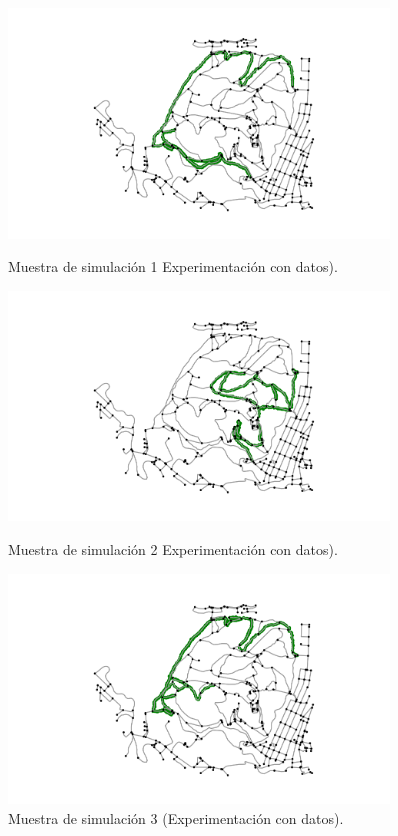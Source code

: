 \begin{figure}[!htb]
\centering
\begin{minipage}{0.70\textwidth}
\includegraphics[width=0.9\textwidth]{./Imagenes/SimulatedTrack1.png}
\caption{Muestra de simulación 1 Experimentación con datos).}
\label{figure:SimulatedTrack1}
\end{minipage}
\begin{minipage}{0.48\textwidth}
\includegraphics[width=0.9\textwidth]{./Imagenes/SimulatedTrack2.png}
\caption{Muestra de simulación 2 Experimentación con datos).}
\label{figure:SimulatedTrack2}
\end{minipage}
\hfill 
\begin{minipage}{0.48\textwidth}
\includegraphics[width=0.9\textwidth]{./Imagenes/SimulatedTrack3.png}
\caption{Muestra de simulación 3 (Experimentación con datos).}
\label{figure:SimulatedTrack3}
\end{minipage}
\end{figure}
\newpage

